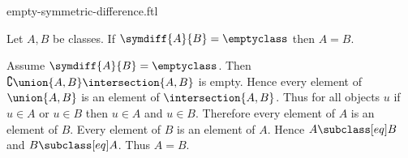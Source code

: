 \documentclass{article}
\begin{document}
\begin{smodule}[creators={Marcel Schütz}]{empty-symmetric-difference.ftl}

  \begin{fproposition*}[label=462183643217920]
    Let $A, B$ be classes.
    If $\symdiff{A}{B} = \emptyclass$ then $A = B$.
  \end{fproposition*}
  \begin{fproof}
    Assume $\symdiff{A}{B} = \emptyclass$.
    Then $\complement{\union{A,B}}{\intersection{A,B}}$ is empty.
    Hence every element of $\union{A,B}$ is an element of $\intersection{A,B}$.
    Thus for all objects $u$ if $u \in A$ or $u \in B$ then $u \in A$ and
    $u \in B$.
    Therefore every element of $A$ is an element of $B$.
    Every element of $B$ is an element of $A$.
    Hence $A \subclass[eq] B$ and $B \subclass[eq] A$.
    Thus $A = B$.
  \end{fproof}
\end{smodule}
\end{document}
